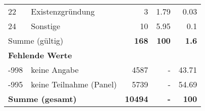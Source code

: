 \begin{longtable}{lXrrr}
     22 &
     \multicolumn{1}{X}{ Existenzgründung   } &


       \num{3} &
       \num[round-mode=places,round-precision=2]{1,79} &
         \num[round-mode=places,round-precision=2]{0,03} \\

     24 &
     \multicolumn{1}{X}{ Sonstige   } &


       \num{10} &
       \num[round-mode=places,round-precision=2]{5,95} &
         \num[round-mode=places,round-precision=2]{0,1} \\
     \midrule
     \multicolumn{2}{l}{Summe (gültig)} &
       \textbf{\num{168}} &
     \textbf{100} &
       \textbf{\num[round-mode=places,round-precision=2]{1,6}} \\
     \multicolumn{5}{l}{\textbf{Fehlende Werte}}\\
       -998 &
       keine Angabe &
         \num{4587} &
        - &
         \num[round-mode=places,round-precision=2]{43,71} \\
       -995 &
       keine Teilnahme (Panel) &
         \num{5739} &
        - &
         \num[round-mode=places,round-precision=2]{54,69} \\
     \midrule
     \multicolumn{2}{l}{\textbf{Summe (gesamt)}} &
          \textbf{\num{10494}} &
        \textbf{-} &
        \textbf{100} \\
     \bottomrule
     \end{longtable}
     
